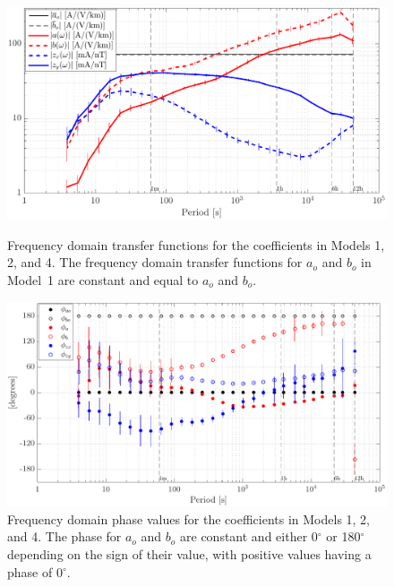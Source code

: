 \documentclass[draft,linenumbers]{agujournal2018}
\begin{document}
\begin{figure}[h]
  \centering
  \includegraphics[width=\textwidth]{figures/plot_model_summary_Z-options-1-v0-o0.pdf}
  \caption{Frequency domain transfer functions for the coefficients in Models 1, 2, and 4. The frequency domain transfer functions for $a_o$ and $b_o$ in Model~1 are constant and equal to $a_o$ and $b_o$.}
  \label{Z}

  \vspace{4em}

  \centering
  \includegraphics[width=\textwidth]{figures/plot_model_summary_Phi-options-1-v1-o0.pdf}
  \caption{Frequency domain phase values for the coefficients in Models 1, 2, and 4. The phase for $a_o$ and $b_o$ are constant and either 0$^{\circ}$ or 180$^{\circ}$ depending on the sign of their value, with positive values having a phase of 0$^{\circ}$.}
  \label{Phi}
\end{figure}
\end{document}
